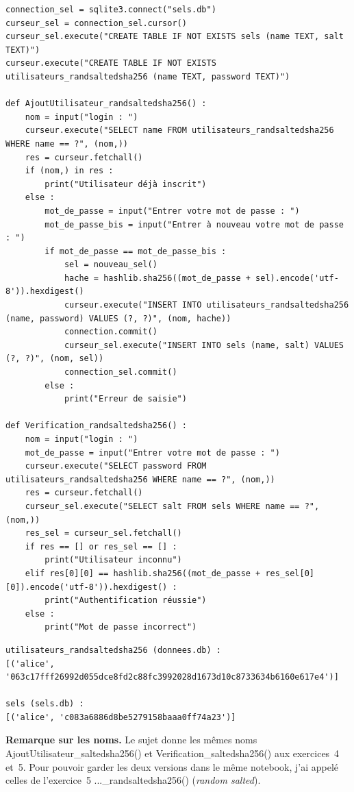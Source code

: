 \documentclass[11pt,a4paper]{article}
\newcommand{\code}[1]{\colorbox{fondcode}{\ttfamily\small #1}}
\begin{document}
\begin{lstlisting}
connection_sel = sqlite3.connect("sels.db")
curseur_sel = connection_sel.cursor()
curseur_sel.execute("CREATE TABLE IF NOT EXISTS sels (name TEXT, salt TEXT)")
curseur.execute("CREATE TABLE IF NOT EXISTS utilisateurs_randsaltedsha256 (name TEXT, password TEXT)")

def AjoutUtilisateur_randsaltedsha256() :
    nom = input("login : ")
    curseur.execute("SELECT name FROM utilisateurs_randsaltedsha256 WHERE name == ?", (nom,))
    res = curseur.fetchall()
    if (nom,) in res :
        print("Utilisateur déjà inscrit")
    else :
        mot_de_passe = input("Entrer votre mot de passe : ")
        mot_de_passe_bis = input("Entrer à nouveau votre mot de passe : ")
        if mot_de_passe == mot_de_passe_bis :
            sel = nouveau_sel()
            hache = hashlib.sha256((mot_de_passe + sel).encode('utf-8')).hexdigest()
            curseur.execute("INSERT INTO utilisateurs_randsaltedsha256 (name, password) VALUES (?, ?)", (nom, hache))
            connection.commit()
            curseur_sel.execute("INSERT INTO sels (name, salt) VALUES (?, ?)", (nom, sel))
            connection_sel.commit()
        else :
            print("Erreur de saisie")

def Verification_randsaltedsha256() :
    nom = input("login : ")
    mot_de_passe = input("Entrer votre mot de passe : ")
    curseur.execute("SELECT password FROM utilisateurs_randsaltedsha256 WHERE name == ?", (nom,))
    res = curseur.fetchall()
    curseur_sel.execute("SELECT salt FROM sels WHERE name == ?", (nom,))
    res_sel = curseur_sel.fetchall()
    if res == [] or res_sel == [] :
        print("Utilisateur inconnu")
    elif res[0][0] == hashlib.sha256((mot_de_passe + res_sel[0][0]).encode('utf-8')).hexdigest() :
        print("Authentification réussie")
    else :
        print("Mot de passe incorrect")
\end{lstlisting}

\begin{lstlisting}[style=sortie]
utilisateurs_randsaltedsha256 (donnees.db) :
[('alice', '063c17fff26992d055dce8fd2c88fc3992028d1673d10c8733634b6160e617e4')]

sels (sels.db) :
[('alice', 'c083a6886d8be5279158baaa0ff74a23')]
\end{lstlisting}

\textbf{Remarque sur les noms.} Le sujet donne les mêmes noms \code{AjoutUtilisateur\_saltedsha256()} et \code{Verification\_saltedsha256()} aux exercices~4 et~5. Pour pouvoir garder les deux versions dans le même notebook, j'ai appelé celles de l'exercice~5 \code{...\_randsaltedsha256()} (\emph{random salted}).
\end{document}
